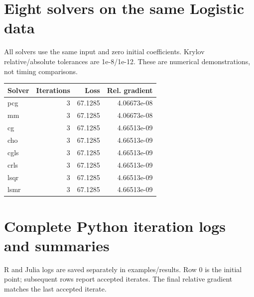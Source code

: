 \documentclass[11pt]{article}
\begin{document}
\section{Eight solvers on the same Logistic data}
All solvers use the same input and zero initial coefficients. Krylov relative/absolute tolerances are 1e-8/1e-12. These are numerical demonstrations, not timing comparisons.
\begin{center}\begin{tabular}{lrrr}\toprule Solver & Iterations & Loss & Rel. gradient \\ \midrule
pcg & 3 & 67.1285 & 4.06673e-08 \\
mm & 3 & 67.1285 & 4.06673e-08 \\
cg & 3 & 67.1285 & 4.66513e-09 \\
cho & 3 & 67.1285 & 4.66513e-09 \\
cgls & 3 & 67.1285 & 4.66513e-09 \\
crls & 3 & 67.1285 & 4.66513e-09 \\
lsqr & 3 & 67.1285 & 4.66513e-09 \\
lsmr & 3 & 67.1285 & 4.66513e-09 \\
\bottomrule\end{tabular}\end{center}
\appendix\section{Complete Python iteration logs and summaries}
R and Julia logs are saved separately in examples/results. Row 0 is the initial point; subsequent rows report accepted iterates. The final relative gradient matches the last accepted iterate.
\end{document}
